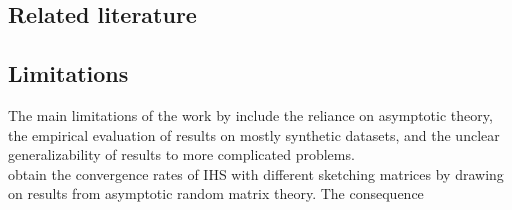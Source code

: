 \subsection{Related literature}

\todo

\subsection{Limitations}

The main limitations of the work by \citet{Lacotte:2020} include the reliance on asymptotic theory, the empirical evaluation of results on mostly synthetic datasets, and the unclear generalizability of results to more complicated problems.
\\

\citet{Lacotte:2020} obtain the convergence rates of IHS with different sketching matrices by drawing on results from asymptotic random matrix theory. The consequence \todo